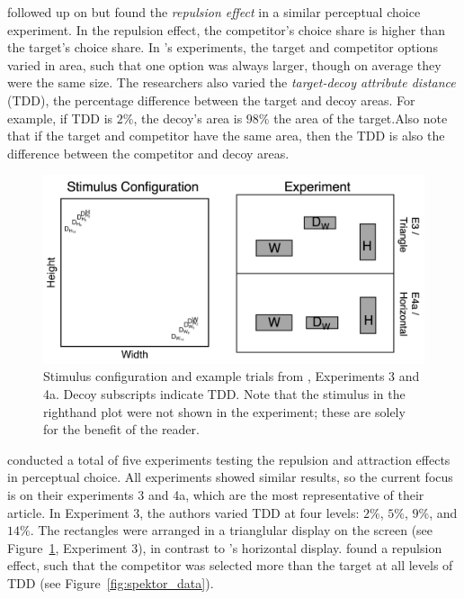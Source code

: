 \textcite{spektorWhenGoodLooks2018b} followed up on \textcite{trueblood2013not} but found the \textit{repulsion effect} in a similar perceptual choice experiment. In the repulsion effect, the competitor's choice share is higher than the target's choice share. In \textcite{spektorWhenGoodLooks2018b}'s experiments, the target and competitor options varied in area, such that one option was always larger, though on average they were the same size. The researchers also varied the \textit{target-decoy attribute distance} (TDD), the percentage difference between the target and decoy areas. For example, if TDD is $2\%$, the decoy's area is $98\%$ the area of the target.Also note that if the target and competitor have the same area, then the TDD is also the difference between the competitor and decoy areas.

\begin{figure}
   \includegraphics[width=\linewidth]{figures/spektor_stim.png}
   \caption{Stimulus configuration and example trials from \textcite{spektorWhenGoodLooks2018b}, Experiments 3 and 4a. Decoy subscripts indicate TDD. Note that the stimulus in the righthand plot were not shown in the experiment; these are solely for the benefit of the reader.}
   \label{fig:spektor_stim}
\end{figure}

\textcite{spektorWhenGoodLooks2018b} conducted a total of five experiments testing the repulsion and attraction effects in perceptual choice. All experiments showed similar results, so the current focus is on their experiments 3 and 4a, which are the most representative of their article. In Experiment 3, the authors varied TDD at four levels: $2\%$, $5\%$, $9\%$, and $14\%$. The rectangles were arranged in a trianglular display on the screen (see Figure~\ref{fig:spektor_stim}, Experiment 3), in contrast to \textcite{trueblood2013not}'s horizontal display. \textcite{spektorWhenGoodLooks2018b} found a repulsion effect, such that the competitor was selected more than the target at all levels of TDD (see Figure~\ref{fig:spektor_data}). 

